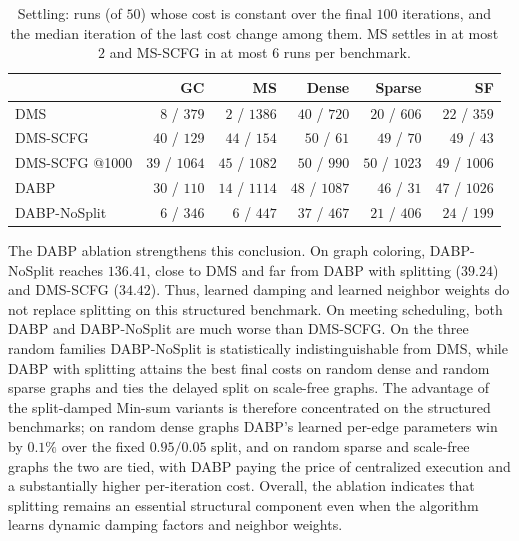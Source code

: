 \begin{table}[t]
\centering
\caption{Settling: runs (of $50$) whose cost is constant over the final
$100$ iterations, and the median iteration of the last cost change among
them.  MS settles in at most $2$ and MS-SCFG in at most $6$ runs per benchmark.}
\label{tab:settling}
\scriptsize
\setlength{\tabcolsep}{3pt}
\begin{tabular}{lrrrrr}
\toprule
& \textbf{GC} & \textbf{MS} & \textbf{Dense} & \textbf{Sparse} & \textbf{SF} \\
\midrule
DMS & $8$ / $379$ & $2$ / $1386$ & $40$ / $720$ & $20$ / $606$ & $22$ / $359$ \\
DMS-SCFG & $40$ / $129$ & $44$ / $154$ & $50$ / $61$ & $49$ / $70$ & $49$ / $43$ \\
DMS-SCFG @1000 & $39$ / $1064$ & $45$ / $1082$ & $50$ / $990$ & $50$ / $1023$ & $49$ / $1006$ \\
DABP & $30$ / $110$ & $14$ / $1114$ & $48$ / $1087$ & $46$ / $31$ & $47$ / $1026$ \\
DABP-NoSplit & $6$ / $346$ & $6$ / $447$ & $37$ / $467$ & $21$ / $406$ & $24$ / $199$ \\
\bottomrule
\end{tabular}
\end{table}
The DABP ablation strengthens this conclusion.  On graph coloring,
DABP-NoSplit reaches $136.41$, close to DMS and far from DABP with splitting
($39.24$) and DMS-SCFG ($34.42$).  Thus, learned damping and learned neighbor
weights do not replace splitting on this structured benchmark.  On meeting
scheduling, both DABP and DABP-NoSplit are much worse than DMS-SCFG.  On the
three random families DABP-NoSplit is statistically indistinguishable from
DMS, while DABP with splitting attains the best final costs on random dense
and random sparse graphs and ties the delayed split on scale-free graphs.
The advantage of the split-damped Min-sum variants is therefore concentrated
on the structured benchmarks; on random dense graphs DABP's learned
per-edge parameters win by $0.1\%$ over the fixed $0.95/0.05$ split, and on
random sparse and scale-free graphs the two are tied, with DABP paying the
price of centralized execution and a substantially higher per-iteration
cost.
Overall, the ablation indicates that splitting remains an essential
structural component even when the algorithm learns dynamic damping
factors and neighbor weights.

